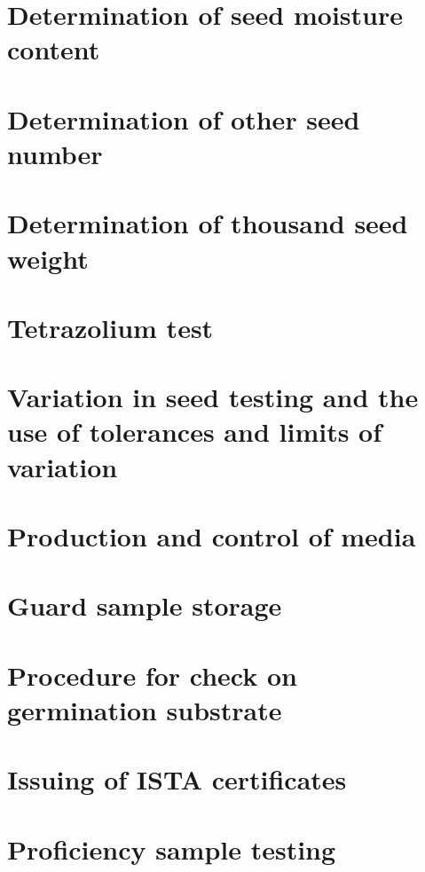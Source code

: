 \documentclass[
]{book}
\begin{document}
\hypertarget{determination-of-seed-moisture-content}{%
\chapter{Determination of seed moisture content}\label{determination-of-seed-moisture-content}}

\hypertarget{determination-of-other-seed-number}{%
\chapter{Determination of other seed number}\label{determination-of-other-seed-number}}

\hypertarget{determination-of-thousand-seed-weight}{%
\chapter{Determination of thousand seed weight}\label{determination-of-thousand-seed-weight}}

\hypertarget{tetrazolium-test}{%
\chapter{Tetrazolium test}\label{tetrazolium-test}}

\hypertarget{variation-in-seed-testing-and-the-use-of-tolerances-and-limits-of-variation}{%
\chapter{Variation in seed testing and the use of tolerances and limits of variation}\label{variation-in-seed-testing-and-the-use-of-tolerances-and-limits-of-variation}}

\hypertarget{production-and-control-of-media}{%
\chapter{Production and control of media}\label{production-and-control-of-media}}

\hypertarget{guard-sample-storage}{%
\chapter{Guard sample storage}\label{guard-sample-storage}}

\hypertarget{procedure-for-check-on-germination-substrate}{%
\chapter{Procedure for check on germination substrate}\label{procedure-for-check-on-germination-substrate}}

\hypertarget{issuing-of-ista-certificates}{%
\chapter{Issuing of ISTA certificates}\label{issuing-of-ista-certificates}}

\hypertarget{proficiency-sample-testing}{%
\chapter{Proficiency sample testing}\label{proficiency-sample-testing}}

  
\end{document}
